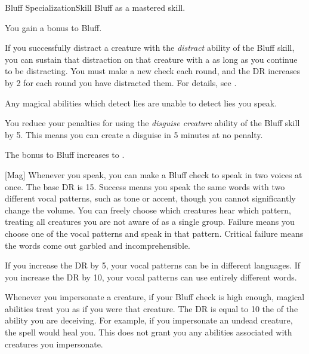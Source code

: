     \begin{feat}{Bluff Specialization}{Skill}
        \featpre Bluff as a mastered skill.
        \featben

         You gain a  bonus to Bluff.

         If you successfully distract a creature with the \textit{distract} ability of the Bluff skill, you can sustain that distraction on that creature with a  as long as you continue to be distracting.
        You must make a new check each round, and the DR increases by 2 for each round you have distracted them.
        For details, see .

         Any magical abilities which detect lies are unable to detect lies you speak.

         You reduce your penalties for using the \textit{disguise creature} ability of the Bluff skill by 5.
        This means you can create a disguise in 5 minutes at no penalty.


         The bonus to Bluff increases to .

        [Mag] Whenever you speak, you can make a Bluff check to speak in two voices at once.
        The base DR is 15.
        Success means you speak the same words with two different vocal patterns, such as tone or accent, though you cannot significantly change the volume.
        You can freely choose which creatures hear which pattern, treating all creatures you are not aware of as a single group.
        Failure means you choose one of the vocal patterns and speak in that pattern.
        Critical failure means the words come out garbled and incomprehensible.

        If you increase the DR by 5, your vocal patterns can be in different languages.
        If you increase the DR by 10, your vocal patterns can use entirely different words.

         Whenever you impersonate a creature, if your Bluff check is high enough, magical abilities treat you as if you were that creature.
        The DR is equal to 10 \add the  of the ability you are deceiving.
        For example, if you impersonate an undead creature, the  spell would heal you.
        This does not grant you any abilities associated with creatures you impersonate.


\end{feat}
